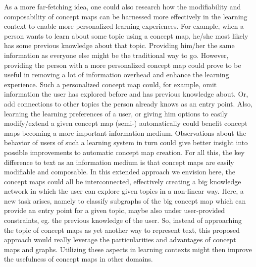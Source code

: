 As a more far-fetching idea, one could also research how the modifiability and composability of concept maps can be harnessed more effectively in the learning context to enable more personalized learning experiences.
For example, when a person wants to learn about some topic using a concept map, he/she most likely has some previous knowledge about that topic.
Providing him/her the same information as everyone else might be the traditional way to go. 
However, providing the person with a more personalized concept map could prove to be useful in removing a lot of information overhead and enhance the learning experience.
Such a personalized concept map could, for example, omit information the user has explored before and has previous knowledge about.
Or, add connections to other topics the person already knows as an entry point.
Also, learning the learning preferences of a user, or giving him options to easily modify/extend a given concept map (semi-) automatically could benefit concept maps becoming a more important information medium.
Observations about the behavior of users of such a learning system in turn could give better insight into possible improvements to automatic concept map creation.
For all this, the key difference to text as an information medium is that concept maps are easily modifiable and composable.
In this extended approach we envision here, the concept maps could all be interconnected, effectively creating a big knowledge network in which the user can explore given topics in a non-linear way.
Here, a new task arises, namely to classify subgraphs of the big concept map which can provide an entry point for a given topic, maybe also under user-provided constraints, eg. the previous knowledge of the user.
So, instead of approaching the topic of concept maps as yet another way to represent text, this proposed approach would really leverage the particularities and advantages of concept maps and graphs.
Utilizing these aspects in learning contexts might then improve the usefulness of concept maps in other domains.



